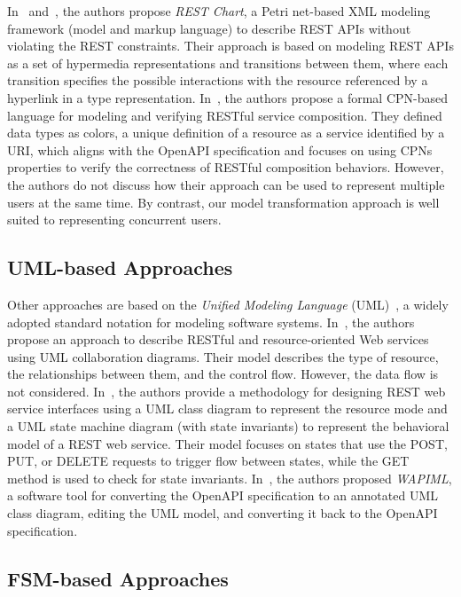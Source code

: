 In~\cite{li2011design} and~\cite{li2015designing}, the authors propose \textit{REST Chart}, a Petri net-based XML modeling framework (model and markup language) to describe REST APIs without violating the REST constraints. Their approach is based on modeling REST APIs as a set of hypermedia representations and transitions between them, where each transition specifies the possible interactions with the resource referenced by a hyperlink in a type representation.
%
In~\cite{kallab2017using}, the authors propose a formal CPN-based language for modeling and verifying RESTful service composition. They defined data types as colors, a unique definition of a resource as a service identified by a URI, which aligns with the OpenAPI specification and focuses on using CPNs properties  to verify the correctness of RESTful composition behaviors. However, the authors do not discuss how their approach can be used to represent multiple users at the same time. By contrast, our model transformation approach is well suited to representing concurrent users.

\subsection{UML-based Approaches}

Other approaches are based on the {\em Unified Modeling Language} (UML)~\cite{UML-11}, a widely adopted standard notation for modeling software systems. In~\cite{alowisheq2011resource}, the authors propose an approach to describe RESTful and resource-oriented Web services using UML collaboration diagrams. Their model describes the type of resource, the relationships between them, and the control flow. However, the data flow is not considered.
%
In~\cite{rauf2014design}, the authors provide a methodology for designing REST web service interfaces using a UML class diagram to represent the resource mode and a UML state machine diagram (with state invariants) to represent the behavioral model of a REST web service. Their model focuses on states that use the POST, PUT, or DELETE requests to trigger flow between states, while  the GET method is used to check for state invariants. 
%
In~\cite{ed2019wapiml}, the authors proposed \textit{WAPIML}, a software tool for converting the OpenAPI specification to an annotated UML class diagram, editing the UML model, and converting it back to the OpenAPI specification.

\subsection{FSM-based Approaches}

